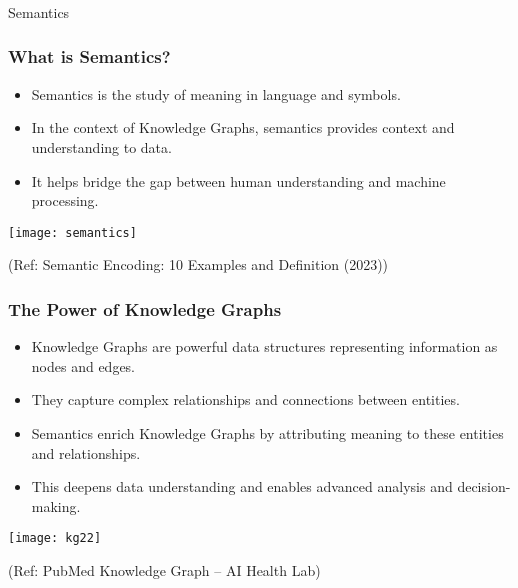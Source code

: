 \begin{frame}[fragile]\frametitle{}
\begin{center}
{\Large Semantics}
\end{center}
\end{frame}


\begin{frame}[fragile]\frametitle{What is Semantics?}
  \begin{itemize}
    \item Semantics is the study of meaning in language and symbols.
    \item In the context of Knowledge Graphs, semantics provides context and understanding to data.
    \item It helps bridge the gap between human understanding and machine processing.
  \end{itemize}

\begin{center}
\texttt{[image: semantics]}

{\tiny (Ref: Semantic Encoding: 10 Examples and Definition (2023))}
\end{center}	
  
\end{frame}  


\begin{frame}[fragile]\frametitle{The Power of Knowledge Graphs}
  \begin{itemize}
    \item Knowledge Graphs are powerful data structures representing information as nodes and edges.
    \item They capture complex relationships and connections between entities.
    \item Semantics enrich Knowledge Graphs by attributing meaning to these entities and relationships.
    \item This deepens data understanding and enables advanced analysis and decision-making.
  \end{itemize}
  
\begin{center}
\texttt{[image: kg22]}

{\tiny (Ref: PubMed Knowledge Graph – AI Health Lab)}

\end{center}	  
\end{frame}

